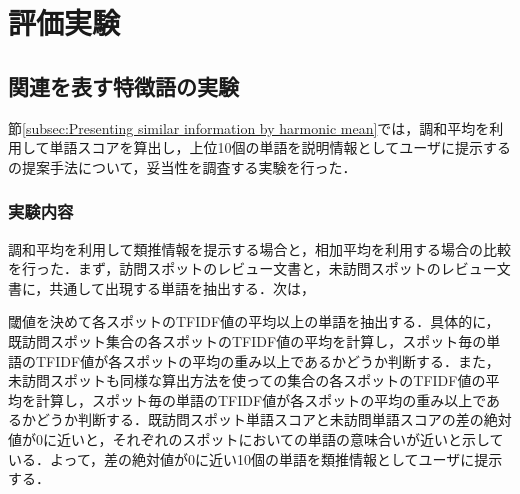 \documentclass{deimj}
\begin{document}
\section{評価実験}
\label{sec:Evaluation Experiment}

\subsection{関連を表す特徴語の実験}
\label{subsec:Experiment of feature word representing relation}

節\ref{subsec:Presenting similar information by harmonic mean}では，調和平均を利用して単語スコアを算出し，上位10個の単語を説明情報としてユーザに提示するの提案手法について，妥当性を調査する実験を行った．

\subsubsection{実験内容}
調和平均を利用して類推情報を提示する場合と，相加平均を利用する場合の比較を行った．まず，訪問スポットのレビュー文書と，未訪問スポットのレビュー文書に，共通して出現する単語を抽出する．次は，

閾値を決めて各スポットのTFIDF値の平均以上の単語を抽出する．具体的に，既訪問スポット集合の各スポットのTFIDF値の平均を計算し，スポット毎の単語のTFIDF値が各スポットの平均の重み以上であるかどうか判断する．また，未訪問スポットも同様な算出方法を使っての集合の各スポットのTFIDF値の平均を計算し，スポット毎の単語のTFIDF値が各スポットの平均の重み以上であるかどうか判断する．既訪問スポット単語スコアと未訪問単語スコアの差の絶対値が0に近いと，それぞれのスポットにおいての単語の意味合いが近いと示している．よって，差の絶対値が0に近い10個の単語を類推情報としてユーザに提示
する．
\end{document}
